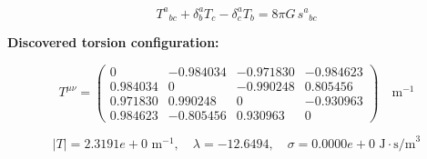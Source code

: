 
\begin{equation}
  T^a{}_{bc} + \delta^a_b T_c - \delta^a_c T_b = 8\pi G \, s^a{}_{bc}
\end{equation}

\textbf{Discovered torsion configuration:}

\begin{equation}
  T^{\mu\nu} = \begin{pmatrix}
    0 & -0.984034 & -0.971830 & -0.984623 \\
    0.984034 & 0 & -0.990248 & 0.805456 \\
    0.971830 & 0.990248 & 0 & -0.930963 \\
    0.984623 & -0.805456 & 0.930963 & 0
  \end{pmatrix} \quad \text{m}^{-1}
\end{equation}

\begin{equation}
  |T| = 2.3191e+0 \text{ m}^{-1}, \quad
  \lambda = -12.6494, \quad
  \sigma = 0.0000e+0 \text{ J}\cdot\text{s/m}^3
\end{equation}